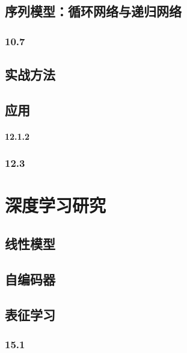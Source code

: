 \documentclass[a4paper,11pt]{book}
\begin{document}
\chapter{序列模型：循环网络与递归网络}
\label{chap:10}

\section{10.7}
\label{sec:10.7}

\chapter{实战方法}
\label{chap:11}

\chapter{应用}
\label{chap:12}


\subsection{12.1.2}
\label{sec:12.1.2}

\section{12.3}
\label{sec:12.3}

\part{深度学习研究}
\label{part:3}

\chapter{线性模型}
\label{chap:13}

\chapter{自编码器}
\label{chap:14}


\chapter{表征学习}
\label{chap:15}


\section{15.1}
\label{sec:15.1}
\end{document}
